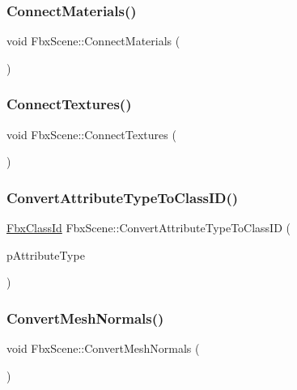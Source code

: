\subsubsection{\texorpdfstring{Connect\+Materials()}{ConnectMaterials()}}
{\footnotesize\ttfamily void Fbx\+Scene\+::\+Connect\+Materials (\begin{DoxyParamCaption}{ }\end{DoxyParamCaption})}

\mbox{\label{class_fbx_scene_aeb20ccb008b9d646c00b78780b4b6c16}} 
\subsubsection{\texorpdfstring{Connect\+Textures()}{ConnectTextures()}}
{\footnotesize\ttfamily void Fbx\+Scene\+::\+Connect\+Textures (\begin{DoxyParamCaption}{ }\end{DoxyParamCaption})}

\mbox{\label{class_fbx_scene_aca61130d681d641f172117b8ae3e89a0}} 
\subsubsection{\texorpdfstring{Convert\+Attribute\+Type\+To\+Class\+I\+D()}{ConvertAttributeTypeToClassID()}}
{\footnotesize\ttfamily \hyperlink{class_fbx_class_id}{Fbx\+Class\+Id} Fbx\+Scene\+::\+Convert\+Attribute\+Type\+To\+Class\+ID (\begin{DoxyParamCaption}\item[{\hyperlink{class_fbx_node_attribute_a08e1669d3d1a696910756ab17de56d6a}{Fbx\+Node\+Attribute\+::\+E\+Type}}]{p\+Attribute\+Type }\end{DoxyParamCaption})}

\mbox{\label{class_fbx_scene_a945048409176af7ce52ecb017cfb69ec}} 
\subsubsection{\texorpdfstring{Convert\+Mesh\+Normals()}{ConvertMeshNormals()}}
{\footnotesize\ttfamily void Fbx\+Scene\+::\+Convert\+Mesh\+Normals (\begin{DoxyParamCaption}{ }\end{DoxyParamCaption})}

